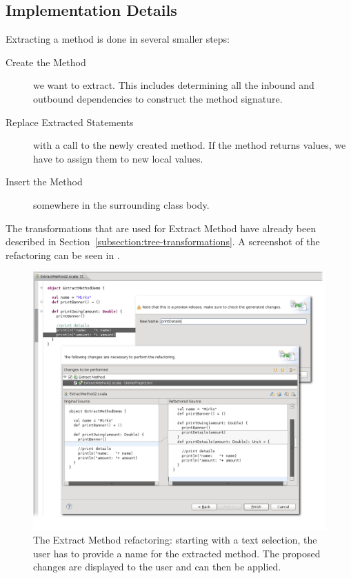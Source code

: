 \documentclass[10pt,a4paper,oneside]{scrreprt}
\begin{document}
\subsection{Implementation Details}

Extracting a method is done in several smaller steps:

\begin{description}
  \item[Create the Method] we want to extract. This includes determining all the inbound and outbound dependencies to construct the method signature.
  \item[Replace Extracted Statements] with a call to the newly created method. If the method returns values, we have to assign them to new local values.
  \item[Insert the Method] somewhere in the surrounding class body.
\end{description}

The transformations that are used for Extract Method have already been described in Section~\vref{subsection:tree-transformations}. A screenshot of the refactoring can be seen in .

\begin{figure}
  \centering
  \includegraphics[width=\linewidth]{extract_method_screenshot_1.png}
  \caption{The Extract Method refactoring: starting with a text selection, the user has to provide a name for the extracted method. The proposed changes are displayed to the user and can then be applied.}
  \label{figure:extract-method-screenshot-1}
\end{figure}
\end{document}

